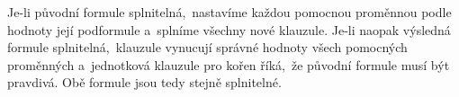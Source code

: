 Je-li původní formule splnitelná,~nastavíme každou pomocnou proměnnou podle hodnoty její podformule a~splníme všechny nové klauzule. Je-li naopak výsledná formule splnitelná,~klauzule vynucují správné hodnoty všech pomocných proměnných a~jednotková klauzule pro kořen říká,~že původní formule musí být pravdivá. Obě formule jsou tedy stejně splnitelné.
